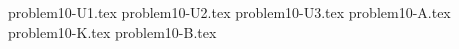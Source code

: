 \documentclass{article}
\begin{document}
{problem10-U1.tex}
{problem10-U2.tex}
{problem10-U3.tex}
{problem10-A.tex}
{problem10-K.tex}
{problem10-B.tex}
\end{document}
